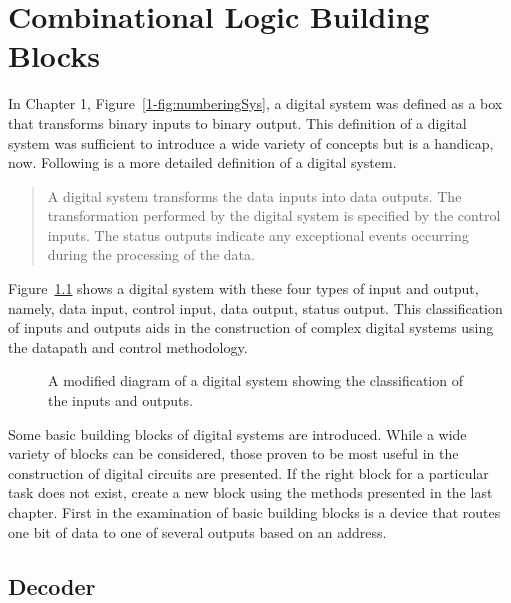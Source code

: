 \chapter{Combinational Logic Building Blocks}
\label{chapter:Combinational Building Blocks}
\graphicspath{ {./chapter04/Fig} }

In Chapter 1, Figure~\ref{1-fig:numberingSys}, a digital system was defined
as a box that transforms binary inputs to binary output.  This definition
of a digital system was sufficient to introduce  a wide variety of
concepts but is a handicap, now. Following is a more detailed
definition of a digital system.
\begin{quote}  A digital system transforms the data inputs into
    data outputs.  The transformation performed by the digital system is
    specified by the control inputs.  The status outputs indicate any
    exceptional events occurring during the processing of the data.
\end{quote}

Figure~\ref{fig:comboBBAsys} shows a digital system with these four types
of input and output, namely, data input, control input, data output, status output.
This classification of inputs and outputs aids in the
construction of complex digital systems using the datapath and
control methodology.

\begin{figure}[ht]
    \caption{A modified diagram of a digital system showing the classification
    of the inputs and outputs.}
    \label{fig:comboBBAsys}
\end{figure}

Some basic building blocks of digital systems are introduced.
While a wide variety of blocks can be considered, those
proven to be most useful in the construction
of digital circuits are presented.  If the right block for a particular
task does not exist, create a new block using the methods presented
in the last chapter.  First in the examination of basic building
blocks is a device that routes one bit of data to one of several
outputs based on an address.

\section{Decoder}

